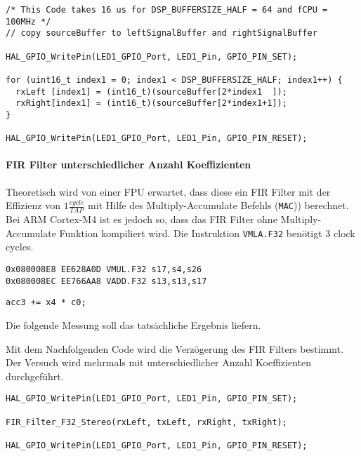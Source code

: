 \begin{lstlisting}[style=Cuvision, caption={GPIO togglen um die Kopierzeit zu messen}]
/* This Code takes 16 us for DSP_BUFFERSIZE_HALF = 64 and fCPU = 100MHz */
// copy sourceBuffer to leftSignalBuffer and rightSignalBuffer

HAL_GPIO_WritePin(LED1_GPIO_Port, LED1_Pin, GPIO_PIN_SET);

for (uint16_t index1 = 0; index1 < DSP_BUFFERSIZE_HALF; index1++) {
  rxLeft [index1] = (int16_t)(sourceBuffer[2*index1  ]);  
  rxRight[index1] = (int16_t)(sourceBuffer[2*index1+1]); 
}

HAL_GPIO_WritePin(LED1_GPIO_Port, LED1_Pin, GPIO_PIN_RESET);
\end{lstlisting}


\paragraph{FIR Filter unterschiedlicher Anzahl Koeffizienten}

Theoretisch wird von einer FPU erwartet, dass diese ein FIR Filter mit der Effizienz von $1\frac{cycle}{TAP}$ mit Hilfe des Multiply-Accumulate Befehls (\texttt{MAC})) berechnet.
Bei ARM Cortex-M4 ist es jedoch so, dass das FIR Filter ohne Multiply-Accumulate Funktion kompiliert wird. Die Instruktion \texttt{VMLA.F32} benötigt 3 clock cycles. 

\begin{lstlisting}[style=Cuvision,caption={Kompilierte Multiply-Accumulate Instruktion}]
0x080008E8 EE628A0D VMUL.F32 s17,s4,s26
0x080008EC EE766AA8 VADD.F32 s13,s13,s17
\end{lstlisting}

\begin{lstlisting}[style=Cuvision,caption={Multiply-Accumulate Befehl in C aus der CMSIS/DSP Library \texttt{arm\_fir\_f32.c}}, firstnumber=465]
    acc3 += x4 * c0;
\end{lstlisting}

Die folgende Messung soll das tatsächliche Ergebnis liefern.

Mit dem Nachfolgenden Code wird die Verzögerung des FIR Filters bestimmt.
Der Versuch wird mehrmals mit unterschiedlicher Anzahl Koeffizienten durchgeführt.

\begin{lstlisting}[style=Cuvision,caption={GPIO togglen um FIR Verarbeitungszeit zu messen}]
HAL_GPIO_WritePin(LED1_GPIO_Port, LED1_Pin, GPIO_PIN_SET);

FIR_Filter_F32_Stereo(rxLeft, txLeft, rxRight, txRight);

HAL_GPIO_WritePin(LED1_GPIO_Port, LED1_Pin, GPIO_PIN_RESET);
\end{lstlisting}



